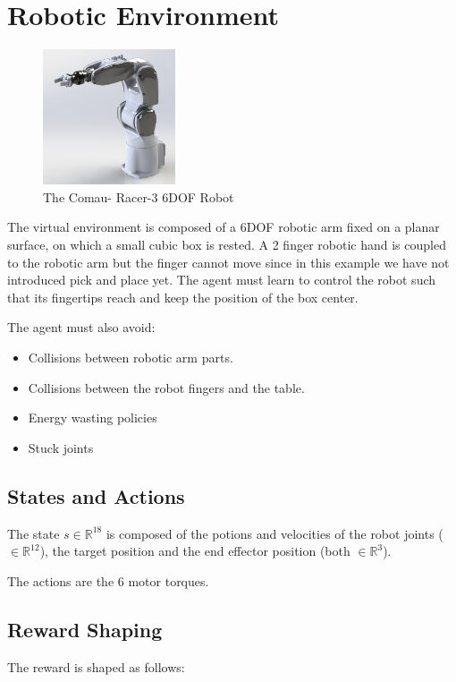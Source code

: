 \documentclass{sig-alternate-05-2015}
\begin{document}
\section{Robotic Environment}
\begin{figure} \label{ComauR3}
\centering
\includegraphics[width=0.35\textwidth]{Figures/RobotRender.JPG}
\caption{The Comau- Racer-3 6DOF Robot}
\end{figure}
The virtual environment is composed of a 6DOF robotic arm fixed on a planar surface, on which a small cubic box is rested. A 2 finger robotic hand is coupled to the robotic arm but the finger cannot move since in this example we have not introduced pick and place yet. The agent must learn to control the robot such that its fingertips reach and keep the position of the box center. 

The agent must also avoid:
\begin{itemize}
    \item Collisions between robotic arm parts.
    \item Collisions between the robot fingers and the table.
    \item Energy wasting policies
    \item Stuck joints
\end{itemize}

\subsection{States and Actions}
The state $s \in \mathbb{R}^{18}$ is composed of the potions and velocities of the robot joints ($\in \mathbb{R}^{12}$), the target position and the end effector position (both $\in \mathbb{R}^{3}$). 

The actions are the 6 motor torques. 
\subsection{Reward Shaping}

The reward is shaped as follows:
\end{document}
